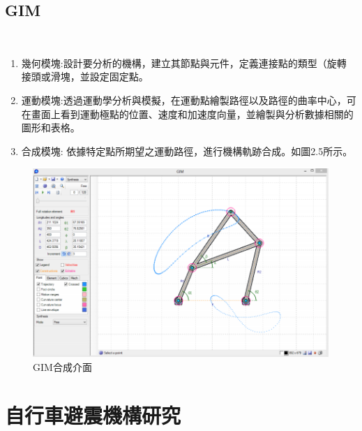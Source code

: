 \documentclass[14pt,a4paper]{report}  %
\newcommand{\fourteen}{\fontsize{14pt}{\baselineskip}\selectfont}%
\begin{document}
       \subsection{GIM}
       	\hspace*{\fill} \\        
        \fourteen {GIM是COMPMECH Research Group創建的註冊免費軟件，用於平面機構的運動模擬合成以及機械結構的靜態分析。GIM軟件具有三個主要模塊：幾何、運動、合成。}
        \begin{enumerate} 
       \item 幾何模塊:設計要分析的機構，建立其節點與元件，定義連接點的類型（旋轉
接頭或滑塊，並設定固定點。
       \item 運動模塊:透過運動學分析與模擬，在運動點繪製路徑以及路徑的曲率中心，可在畫面上看到運動極點的位置、速度和加速度向量，並繪製與分析數據相關的圖形和表格。
       \item 合成模塊: 依據特定點所期望之運動路徑，進行機構軌跡合成。如圖2.5所示。
       \end{enumerate}
        \begin{figure}[H]
        \centering
        \includegraphics[scale=0.8]{GIM.png} 
        \caption{GIM合成介面} 
        \label{fig:scale}
    	\end{figure}
      \newpage
      \section{自行車避震機構研究}
\end{document}

